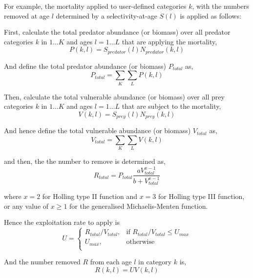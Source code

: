 For example, the mortality applied to user-defined categories $k$, with the numbers removed at age $l$ determined by a selectivity-at-age $S(l)$ is applied as follows:

First, calculate the total predator abundance (or biomass) over all predator categories $k$ in $1 \ldots K$ and ages $l = 1 \ldots L$ that are applying the mortality,
\begin{equation}
  P(k,l) = S_{predator}(l) N_{predator}(k,l)
\end{equation}

And define the total predator abundance (or biomass) $P_{total}$ as,
\begin{equation}
  P_{total}  = \sum\limits_K {\sum\limits_L {P(k,l)}} 
\end{equation}

Then, calculate the total vulnerable abundance (or biomass) over all prey categories $k$ in $1 \ldots K$ and ages $l = 1 \ldots L$ that are subject to the mortality,
\begin{equation}
  V(k,l) = S_{prey}(l) N_{prey}(k,l)
\end{equation}

And hence define the total vulnerable abundance (or biomass) $V_{total}$ as,
\begin{equation}
  V_{total}  = \sum\limits_K {\sum\limits_L {V(k,l)}} 
\end{equation}

and then, the the number to remove is determined as,
\begin{equation}
R_{total} = P_{total} \frac{a  V_{total}^{x-1}}{b + V_{total}^{x-1}}
\end{equation}

where $x=2$ for Holling type II function and $x=3$ for Holling type III function, or any value of $x \geq 1$ for the generalised Michaelis-Menten function.

Hence the exploitation rate to apply is 
\begin{equation}
U = \begin{cases}
  R_{total}/V_{total}, & \text{if $R_{total}/V_{total} \leq U_{max}$} \\
  U_{max}, & \text{otherwise}\\ 
  \end{cases} 
\end{equation}

And the number removed $R$ from each age $l$ in category $k$ is,
\begin{equation}
  R(k,l) = UV(k,l)
\end{equation}

